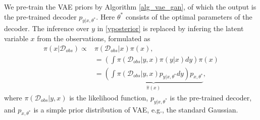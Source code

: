 We pre-train the VAE priors by Algorithm \ref{alg_vae_gan}, of which the output  is the pre-trained decoder $p_{y|x,\theta^*}$. Here $\theta^*$ consists of the optimal parameters of the decoder.
The inference over $y$ in  \eqref{yposterior} is replaced by infering the latent variable $x$ from the observations, formulated as
\begin{align}
	\pi(x|\mathcal{D}_{obs})\propto &{\pi(\mathcal{D}_{obs}|x)\pi(x)}, \nonumber\\
	&=\left(\int \pi(\mathcal{D}_{obs}|y,x) \pi(y|x) dy\right) \pi(x)\nonumber\\
	&= \underbrace{\left(\int \pi(\mathcal{D}_{obs}|y,x) p_{y|x,\theta^*} dy\right) p_{x,\theta^*}}_{\hat{\pi}(x)}, \label{xposterior}
\end{align}
where $\pi(\mathcal{D}_{obs}|y,x) $ is the likelihood function, $p_{y|x,\theta^*}$ is the pre-trained decoder, and $p_{x,\theta^*}$ is a simple prior distribution of VAE, e.g., the standard Gaussian. %
